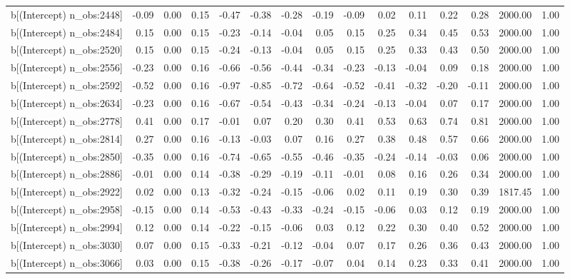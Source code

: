 \begin{table}[ht]
\begin{tabular}{rrrrrrrrrrrrrrr}
  b[(Intercept) n\_obs:2448] & -0.09 & 0.00 & 0.15 & -0.47 & -0.38 & -0.28 & -0.19 & -0.09 & 0.02 & 0.11 & 0.22 & 0.28 & 2000.00 & 1.00 \\ 
  b[(Intercept) n\_obs:2484] & 0.15 & 0.00 & 0.15 & -0.23 & -0.14 & -0.04 & 0.05 & 0.15 & 0.25 & 0.34 & 0.45 & 0.53 & 2000.00 & 1.00 \\ 
  b[(Intercept) n\_obs:2520] & 0.15 & 0.00 & 0.15 & -0.24 & -0.13 & -0.04 & 0.05 & 0.15 & 0.25 & 0.33 & 0.43 & 0.50 & 2000.00 & 1.00 \\ 
  b[(Intercept) n\_obs:2556] & -0.23 & 0.00 & 0.16 & -0.66 & -0.56 & -0.44 & -0.34 & -0.23 & -0.13 & -0.04 & 0.09 & 0.18 & 2000.00 & 1.00 \\ 
  b[(Intercept) n\_obs:2592] & -0.52 & 0.00 & 0.16 & -0.97 & -0.85 & -0.72 & -0.64 & -0.52 & -0.41 & -0.32 & -0.20 & -0.11 & 2000.00 & 1.00 \\ 
  b[(Intercept) n\_obs:2634] & -0.23 & 0.00 & 0.16 & -0.67 & -0.54 & -0.43 & -0.34 & -0.24 & -0.13 & -0.04 & 0.07 & 0.17 & 2000.00 & 1.00 \\ 
  b[(Intercept) n\_obs:2778] & 0.41 & 0.00 & 0.17 & -0.01 & 0.07 & 0.20 & 0.30 & 0.41 & 0.53 & 0.63 & 0.74 & 0.81 & 2000.00 & 1.00 \\ 
  b[(Intercept) n\_obs:2814] & 0.27 & 0.00 & 0.16 & -0.13 & -0.03 & 0.07 & 0.16 & 0.27 & 0.38 & 0.48 & 0.57 & 0.66 & 2000.00 & 1.00 \\ 
  b[(Intercept) n\_obs:2850] & -0.35 & 0.00 & 0.16 & -0.74 & -0.65 & -0.55 & -0.46 & -0.35 & -0.24 & -0.14 & -0.03 & 0.06 & 2000.00 & 1.00 \\ 
  b[(Intercept) n\_obs:2886] & -0.01 & 0.00 & 0.14 & -0.38 & -0.29 & -0.19 & -0.11 & -0.01 & 0.08 & 0.16 & 0.26 & 0.34 & 2000.00 & 1.00 \\ 
  b[(Intercept) n\_obs:2922] & 0.02 & 0.00 & 0.13 & -0.32 & -0.24 & -0.15 & -0.06 & 0.02 & 0.11 & 0.19 & 0.30 & 0.39 & 1817.45 & 1.00 \\ 
  b[(Intercept) n\_obs:2958] & -0.15 & 0.00 & 0.14 & -0.53 & -0.43 & -0.33 & -0.24 & -0.15 & -0.06 & 0.03 & 0.12 & 0.19 & 2000.00 & 1.00 \\ 
  b[(Intercept) n\_obs:2994] & 0.12 & 0.00 & 0.14 & -0.22 & -0.15 & -0.06 & 0.03 & 0.12 & 0.22 & 0.30 & 0.40 & 0.52 & 2000.00 & 1.00 \\ 
  b[(Intercept) n\_obs:3030] & 0.07 & 0.00 & 0.15 & -0.33 & -0.21 & -0.12 & -0.04 & 0.07 & 0.17 & 0.26 & 0.36 & 0.43 & 2000.00 & 1.00 \\ 
  b[(Intercept) n\_obs:3066] & 0.03 & 0.00 & 0.15 & -0.38 & -0.26 & -0.17 & -0.07 & 0.04 & 0.14 & 0.23 & 0.33 & 0.41 & 2000.00 & 1.00 \\ 

\end{tabular}
\end{table}
